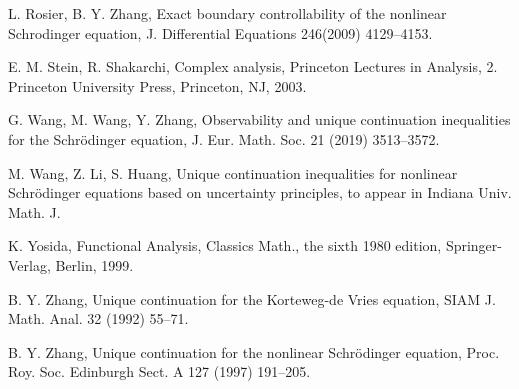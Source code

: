 \documentclass[preprint,12pt]{elsarticle}
\begin{document}
\begin{thebibliography}{999}
{ L. Rosier, B. Y. Zhang,  Exact boundary controllability of the nonlinear Schrodinger equation, J. Differential Equations 246(2009) 4129--4153.

 E. M. Stein, R. Shakarchi, Complex analysis, Princeton Lectures in Analysis, 2. Princeton University Press, Princeton, NJ, 2003.

   G. Wang, M. Wang, Y. Zhang, Observability and unique continuation inequalities for the Schr\"{o}dinger equation, J. Eur. Math. Soc.  21 (2019) 3513--3572.


 M. Wang, Z. Li, S. Huang, Unique continuation inequalities for nonlinear Schr\"{o}dinger equations based on uncertainty principles, to appear in Indiana Univ. Math. J.

 K. Yosida, Functional Analysis, Classics Math., the sixth 1980 edition, Springer-Verlag, Berlin, 1999.


 B. Y. Zhang,   Unique continuation for the Korteweg-de Vries equation, SIAM J. Math. Anal. 32 (1992)  55--71.

 B. Y. Zhang,   Unique continuation for the nonlinear Schr\"odinger equation, Proc. Roy. Soc. Edinburgh Sect. A 127 (1997)  191--205.
}
\end{thebibliography}
\end{document}

